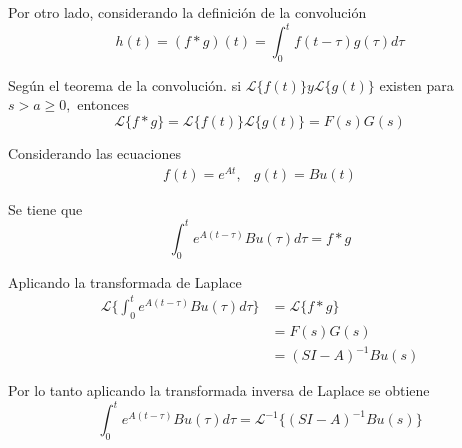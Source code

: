 Por otro lado, considerando la definición de la convolución
\[
    h(t)=(f*g)(t) = \int_{0}^{t} f(t-\tau)g(\tau)d\tau 
\]

Según el teorema de la convolución. si \( \mathcal{L} \{ f(t) \} y \mathcal{L} \{g(t)\} \) existen para \( s>a\geq 0, \) entonces
\[
    \mathcal{L} \{f* g\} = \mathcal{L} \{ f(t) \} \mathcal{L} \{ g(t) \}=F(s)G(s)
\]

Considerando las ecuaciones 
\[
    \begin{matrix}
        f(t)=e^{At}, & g(t)=Bu(t)
    \end{matrix}
\]

Se tiene que 
\[
    \int_{0}^{t} e^{A(t-\tau)} Bu(\tau)d\tau = f*g
\]

Aplicando la transformada de Laplace
\[
    \begin{split}
        \mathcal{L} \Big\{ \int_{0}^{t} e^{A(t-\tau)} Bu(\tau)d\tau \Big\} & =\mathcal{L} \Big\{ f*g \Big\} \\
        & = F(s)G(s) \\
        & = (SI-A)^{-1}Bu(s)
    \end{split}
\]

Por lo tanto aplicando la transformada inversa de Laplace se obtiene
\[
    \int_{0}^{t} e^{A(t-\tau)} Bu(\tau) d\tau = \mathcal{L}^{-1} \Big\{ (SI-A)^{-1}Bu(s) \Big \}
\]